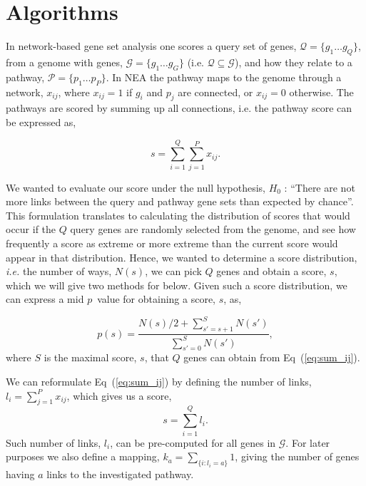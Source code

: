 \documentclass[10pt,letterpaper]{article}
\begin{document}
\section*{Algorithms}

In network-based gene set analysis one scores a query set of genes, $ \mathcal{Q}=\{g_1 \ldots g_Q\}$, from a genome with genes, $\mathcal{G}=\{g_1 \ldots g_G\}$ (i.e. $\mathcal{Q} \subseteq \mathcal{G}$), and how they relate to a pathway, $\mathcal{P}=\{p_1 \ldots p_P\}$. In NEA the pathway maps to the genome through a network, ${x_{ij}}$, where $x_{ij}=1$ if $g_i$ and $p_j$ are connected, or $x_{ij}=0$ otherwise. The pathways are scored by summing up all connections, i.e. the pathway score can be expressed as,

\begin{equation}
s=\sum_{i=1}^Q\sum_{j=1}^P x_{ij}.
\label{eq:sum_ij}
\end{equation}

We wanted to evaluate our score under the null hypothesis, $H_0$ : ``There are not more links between the query and pathway gene sets than expected by chance''. This formulation translates to calculating the distribution of scores that would occur if the $Q$ query genes are randomly selected from the genome, and see how frequently a score as extreme or more extreme than the current score would appear in that distribution. Hence, we wanted to determine a score distribution, {\em i.e.} the number of ways, $N(s)$, we can pick $Q$ genes and obtain a score, $s$, which we will give two methods for below. Given such a score distribution, we can express a mid $p$~value\cite{lancaster1961significance,hwang2001optimality} for obtaining a score, $s$, as,

\begin{equation}
p(s)=\frac{N(s)/2 +\sum_{s'=s+1}^{S} N(s')}{\sum_{s'=0}^{S} N(s')},
\label{eq:pval}
\end{equation}
where $S$ is the maximal score, $s$, that $Q$ genes can obtain from Eq~(\ref{eq:sum_ij}).

We can reformulate Eq~(\ref{eq:sum_ij}) by defining the number of links, $l_i=\sum_{j=1}^P x_{ij}$, which gives us a score,
\begin{equation}
s=\sum_{i=1}^Q l_i.
\label{eq:sum_i}
\end{equation}
Such number of links, $l_i$, can be pre-computed for all genes in $\mathcal{G}$. For later purposes we also define a mapping, $k_a=\sum_{\{i:l_i=a\}}1$, giving the number of genes having $a$ links to the investigated pathway.
\end{document}
